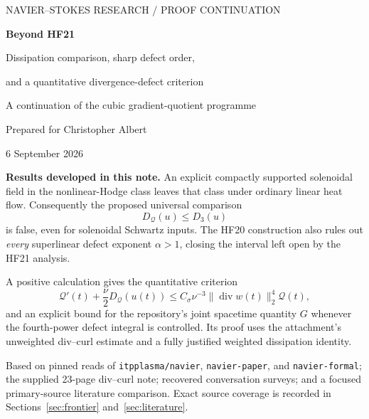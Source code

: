 \documentclass[11pt,a4paper]{article}
\theoremstyle{definition}
\theoremstyle{remark}
\newcommand{\Q}{\mathcal Q}
\newcommand{\norm}[1]{\lVert #1\rVert}
\newcommand{\diver}{\operatorname{div}}
\newcommand{\repo}[1]{{\small\texttt{#1}}}
\numberwithin{equation}{section}
\begin{document}
\begin{titlepage}
\thispagestyle{empty}
\vspace*{12mm}
{\sffamily\small\color{teal!65!black} NAVIER--STOKES RESEARCH / PROOF CONTINUATION\par}
\vspace{8mm}
{\LARGE\bfseries Beyond HF21\par}
\vspace{4mm}
{\Large Dissipation comparison, sharp defect order,\par and a quantitative divergence-defect criterion\par}
\vspace{8mm}
{\large A continuation of the cubic gradient-quotient programme\par}
\vspace{6mm}
Prepared for Christopher Albert\par
6 September 2026\par
\vspace{10mm}
\noindent\begin{minipage}{\textwidth}
\textbf{Results developed in this note.} An explicit compactly supported solenoidal field in the nonlinear-Hodge class leaves that class under ordinary linear heat flow. Consequently the proposed universal comparison
\[
D_{\Q}(u)\le D_3(u)
\]
is false, even for solenoidal Schwartz inputs. The HF20 construction also rules out \emph{every} superlinear defect exponent \(\alpha>1\), closing the interval left open by the HF21 analysis.

A positive calculation gives the quantitative criterion
\[
\Q'(t)+\frac\nu2D_{\Q}(u(t))
\le C_\sigma\nu^{-3}\norm{\diver w(t)}_2^4\Q(t),
\]
and an explicit bound for the repository's joint spacetime quantity \(G\) whenever the fourth-power defect integral is controlled. Its proof uses the attachment's unweighted div--curl estimate and a fully justified weighted dissipation identity.
\end{minipage}\par
\vspace{9mm}
\noindent{}
\vfill
{\small Based on pinned reads of \repo{itpplasma/navier}, \repo{navier-paper}, and \repo{navier-formal}; the supplied 23-page div--curl note; recovered conversation surveys; and a focused primary-source literature comparison. Exact source coverage is recorded in Sections~\ref{sec:frontier} and~\ref{sec:literature}.}
\end{titlepage}
{\small\setlength{\parskip}{0pt}\tableofcontents}
\newpage
\end{document}
